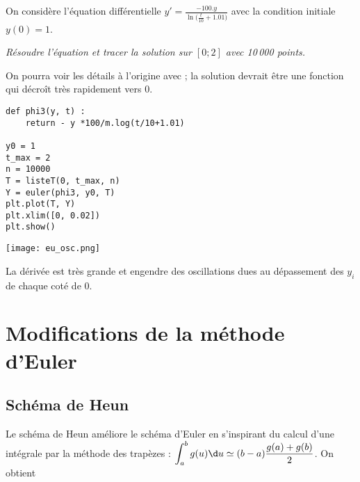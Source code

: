 On considère l'équation différentielle $\displaystyle y' = \frac{-100.y}{\ln\bigl(\frac t{10}+1.01\bigr)}$ avec la condition initiale $y(0)=1$.
\begin{Exercise}[label = Oscillations]\it
Résoudre l'équation et tracer la solution sur $[0;2]$ avec 10\,000 points.

On pourra voir les détails à l'origine avec  ; la solution devrait être une fonction qui décroît très rapidement vers 0.
\end{Exercise}
\begin{Answer}
\begin{lstlisting}
def phi3(y, t) :
    return - y *100/m.log(t/10+1.01)

y0 = 1
t_max = 2
n = 10000
T = listeT(0, t_max, n)
Y = euler(phi3, y0, T)
plt.plot(T, Y)
plt.xlim([0, 0.02])
plt.show()
\end{lstlisting}
\begin{center}
	\texttt{[image: eu\_osc.png]}
\end{center}
La dérivée est très grande et engendre des oscillations dues au dépassement des $y_i$ de chaque coté de 0.
\end{Answer}
\section{Modifications de la méthode d'Euler}
\subsection{Schéma de Heun}
Le schéma de Heun améliore le schéma d'Euler en s'inspirant du calcul d'une intégrale par la méthode des trapèzes : $\displaystyle \int_{a}^b g(u) \d u\simeq (b-a)\frac{g(a)+g(b)}2$. On obtient

